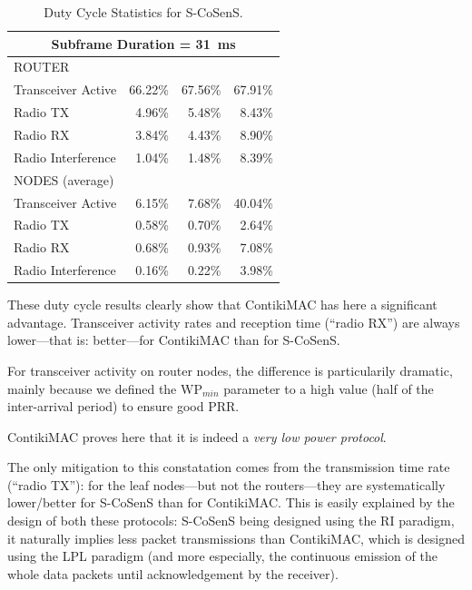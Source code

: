 \documentclass[conference]{IEEEtran}
\begin{document}
\begin{table}[tbph]
\begin{tabular}{|l|r|r|r|}
\multicolumn{4}{|c|}{Subframe Duration = 31~ms}\\
\hline
 ROUTER & \multicolumn{3}{|c|}{ }\\
\hline
Transceiver Active & 66.22\% & 67.56\% & 67.91\% \\
Radio TX           &  4.96\% &  5.48\% &  8.43\% \\
Radio RX           &  3.84\% &  4.43\% &  8.90\% \\
Radio Interference &  1.04\% &  1.48\% &  8.39\% \\
\hline
 NODES (average) & \multicolumn{3}{|c|}{ }\\
\hline
Transceiver Active & 6.15\% & 7.68\% & 40.04\% \\
Radio TX           & 0.58\% & 0.70\% &  2.64\% \\
Radio RX           & 0.68\% & 0.93\% &  7.08\% \\
Radio Interference & 0.16\% & 0.22\% &  3.98\% \\

\hline
\end{tabular}
\caption{Duty Cycle Statistics for S-CoSenS.}
\label{TblDutyCyclesSCoSenS}
\end{table}

These duty cycle results clearly show that ContikiMAC has here a significant
advantage. Transceiver activity rates and reception time (``radio RX'')
are always lower---that is: better---for ContikiMAC than for S-CoSenS.

For transceiver activity on router nodes, the difference is particularily
dramatic, mainly because we defined the $\mathrm{WP}_{min}$ parameter
to a high value (half of the inter-arrival period) to ensure good PRR.

ContikiMAC proves here that it is indeed a \emph{very low power protocol}.

The only mitigation to this constatation comes from the transmission time
rate (``radio TX''): for the leaf nodes---but not the routers---they are
systematically lower/better for S-CoSenS than for ContikiMAC. This is
easily explained by the design of both these protocols: S-CoSenS being
designed using the RI paradigm, it naturally implies less packet
transmissions than ContikiMAC, which is designed using the LPL
paradigm (and more especially, the continuous emission of the
whole data packets until acknowledgement by the receiver).

\end{document}
